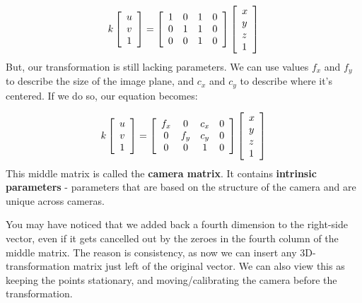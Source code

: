 \documentclass{article}
\begin{document}
\[
k \left[ \begin{array} { c } { u } \\ { v } \\ { 1 } \end{array} \right] = \left[ \begin{array} { c c c c } { 1 } & { 0 } & { 1 } & { 0 } \\ { 0 } & { 1 } & { 1 } & { 0 } \\ { 0 } & { 0 } & { 1 } & { 0 } \end{array} \right] \left[ \begin{array} { l } { x } \\ { y } \\ { z } \\ { 1 } \end{array} \right]
\]
\noident
But, our transformation is still lacking parameters. We can use values $f_x$ and $f_y$ to describe the size of the image plane, and $c_x$ and $c_y$ to describe where it's centered. If we do so, our equation becomes:

\[
k \left[ \begin{array} { c } { u } \\ { v } \\ { 1 } \end{array} \right] = \left[ \begin{array} { c c c c } { f _ { x } } & { 0 } & { c _ { x } } & { 0 } \\ { 0 } & { f _ { y } } & { c _ { y } } & { 0 } \\ { 0 } & { 0 } & { 1 } & { 0 } \end{array} \right] \left[ \begin{array} { l } { x } \\ { y } \\ { z } \\ { 1 } \end{array} \right]
\]
\noident
This middle matrix is called the \textbf{camera matrix}. It contains \textbf{intrinsic parameters} - parameters that are based on the structure of the camera and are unique across cameras.

You may have noticed that we added back a fourth dimension to the right-side vector, even if it gets cancelled out by the zeroes in the fourth column of the middle matrix. The reason is consistency, as now we can insert any 3D-transformation matrix just left of the original vector. We can also view this as keeping the points stationary, and moving/calibrating the camera before the transformation.
\end{document}
